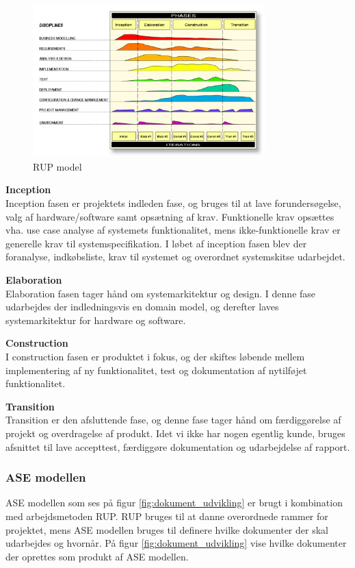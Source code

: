 \begin{figure}[H]
	\centering
	\includegraphics[width=0.80\textwidth]{Billeder/Udviklingsproces/RUP}
	\caption{RUP model}
	\label{fig:rup}
\end{figure}

\textbf{Inception}\\
Inception fasen er projektets indleden fase, og bruges til at lave forundersøgelse, valg af hardware/software samt opsætning af krav. Funktionelle krav opsættes vha. use case analyse af systemets funktionalitet, mens ikke-funktionelle krav er generelle krav til systemspecifikation.
I løbet af inception fasen blev der foranalyse, indkøbsliste, krav til systemet og overordnet systemskitse udarbejdet. 

\textbf{Elaboration}\\
Elaboration fasen tager hånd om systemarkitektur og design. I denne fase udarbejdes der indledningsvis en domain model, og derefter laves systemarkitektur for hardware og software. 

\textbf{Construction}\\
I construction fasen er produktet i fokus, og der skiftes løbende mellem implementering af ny funktionalitet, test og dokumentation af nytilføjet funktionalitet. 

\textbf{Transition}\\
Transition er den afsluttende fase, og denne fase tager hånd om færdiggørelse af projekt og overdragelse af produkt. Idet vi ikke har nogen egentlig kunde, bruges afsnittet til lave accepttest, færdiggøre dokumentation og udarbejdelse af rapport. 

\newpage

\subsubsection{ASE modellen}
ASE modellen som ses på figur \ref{fig:dokument_udvikling} er brugt i kombination med arbejdsmetoden RUP. RUP bruges til at danne overordnede rammer for projektet, mens ASE modellen bruges til definere hvilke dokumenter der skal udarbejdes og hvornår. På figur \ref{fig:dokument_udvikling} vise hvilke dokumenter der oprettes som produkt af ASE modellen. 

